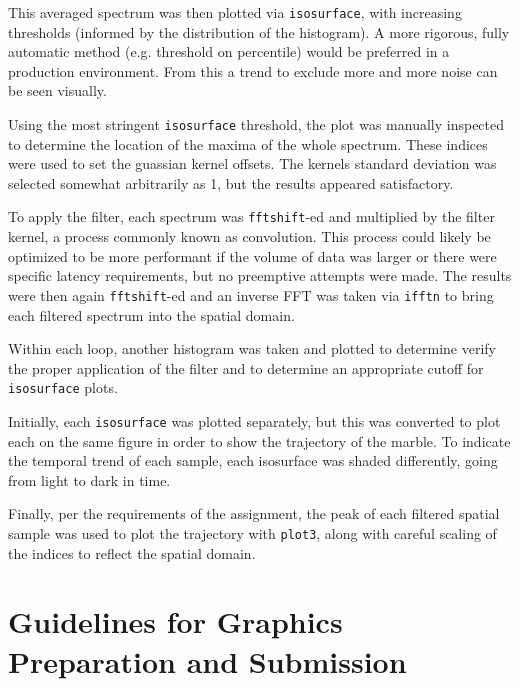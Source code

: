 \documentclass[journal]{IEEEtran}
\def\code#1{\texttt{#1}}
\begin{document}

This averaged spectrum was then plotted via \code{isosurface}, with increasing thresholds (informed by the distribution of the histogram). A more rigorous, fully automatic method (e.g. threshold on percentile) would be preferred in a production environment. From this a trend to exclude more and more noise can be seen visually.


Using the most stringent \code{isosurface} threshold, the plot was manually inspected to determine the location of the maxima of the whole spectrum. These indices were used to set the guassian kernel offsets. The kernels standard deviation was selected somewhat arbitrarily as 1, but the results appeared satisfactory.

To apply the filter, each spectrum was \code{fftshift}-ed and multiplied by the filter kernel, a process commonly known as convolution. This process could likely be optimized to be more performant if the volume of data was larger or there were specific latency requirements, but no preemptive attempts were made. The results were then again \code{fftshift}-ed and an inverse FFT was taken via \code{ifftn} to bring each filtered spectrum into the spatial domain.

Within each loop, another histogram was taken and plotted to determine verify the proper application of the filter and to determine an appropriate cutoff for \code{isosurface} plots.


Initially, each \code{isosurface} was plotted separately, but this was converted to plot each on the same figure in order to show the trajectory of the marble. To indicate the temporal trend of each sample, each isosurface was shaded differently, going from light to dark in time.


Finally, per the requirements of the assignment, the peak of each filtered spatial sample was used to plot the trajectory with \code{plot3}, along with careful scaling of the indices to reflect the spatial domain.





\section{Guidelines for Graphics Preparation and Submission}
\label{sec:guidelines}
\end{document}

